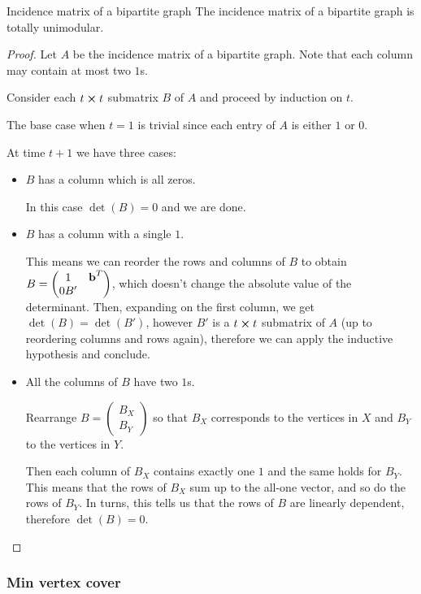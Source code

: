 \documentclass[12pt]{extarticle}
\renewcommand{\vec}[1]{\bvec{#1}}
\begin{document}
\begin{proposition}{Incidence matrix of a bipartite graph}{}
	The incidence matrix of a bipartite graph is totally unimodular.
\end{proposition}
\begin{proof}
	Let $A$ be the incidence matrix of a bipartite graph.
	Note that each column may contain at most two $1$s.

	Consider each $t \cross t$ submatrix $B$ of $A$ and proceed by induction on $t$.

	The base case when $t = 1$ is trivial since each entry of $A$ is either $1$ or $0$.

	At time $t+1$ we have three cases:
	\begin{itemize}
		\item $B$ has a column which is all zeros.

		      In this case $\det(B) = 0$ and we are done.
		\item $B$ has a column with a single $1$.

		      This means we can reorder the rows and columns of $B$ to obtain
		      $B = \begin{pmatrix} 1 & \vec b^T \\ 0 B' \end{pmatrix}$, which doesn't change the absolute
		      value of the determinant.
		      Then, expanding on the first column, we get $\det(B) = \det(B')$, however $B'$ is a
		      $t \cross t$ submatrix of $A$ (up to reordering columns and rows again), therefore we can
		      apply the inductive hypothesis and conclude.

		\item All the columns of $B$ have two $1$s.

		      Rearrange $B=\begin{pmatrix} B_X \\ B_Y \end{pmatrix}$ so that $B_X$ corresponds to the
		      vertices in $X$ and $B_Y$ to the vertices in $Y$.

		      Then each column of $B_X$ contains exactly one $1$ and the same holds for $B_Y$.
		      This means that the rows of $B_X$ sum up to the all-one vector, and so do the rows of
		      $B_Y$.
		      In turns, this tells us that the rows of $B$ are linearly dependent,
		      therefore $\det(B) = 0$.
		      \qedhere
	\end{itemize}
\end{proof}

\subsubsection{Min vertex cover}
\end{document}
